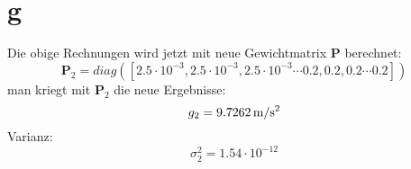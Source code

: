 \section{g}
Die obige Rechnungen wird jetzt mit neue Gewichtmatrix $\bm{P}$ berechnet:
\begin{equation*}
	\bm{P}_2 = diag([2.5\cdot10^{-3},2.5\cdot10^{-3},2.5\cdot10^{-3} \cdots 0.2, 0.2, 0.2\cdots 0.2])
\end{equation*}
man kriegt mit $\bm{P}_2$ die neue Ergebnisse:
\begin{equation*}
	g_2 = 9.7262 \,\mathrm{m/s^2}
\end{equation*}
Varianz:
\begin{equation*}
	\sigma^2_2 = 1.54 \cdot 10^{-12}
\end{equation*}